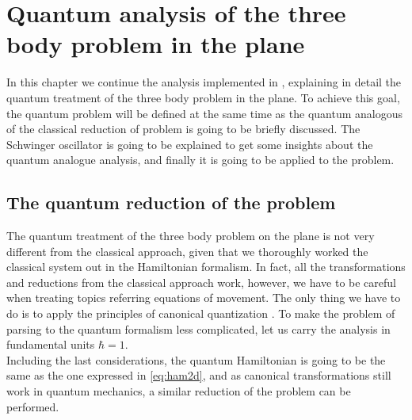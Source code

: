 \chapter{Quantum analysis of the three body problem in the plane}
In this chapter we continue the analysis implemented in \cite{alonso}, explaining in detail the quantum treatment of the three body problem in the plane. To achieve this goal, the quantum problem will be defined at the same time as the quantum analogous of the classical reduction of problem is going to be briefly discussed. The Schwinger oscillator is going to be explained to get some insights about the quantum analogue analysis, and finally it is going to be applied to the problem.\\

\section{The quantum reduction of the problem}
The quantum treatment of the three body problem on the plane is not very different from the classical approach, given that we thoroughly worked the classical system out in the Hamiltonian formalism. In fact, all the transformations and reductions from the classical approach work, however, we have to be careful when treating topics referring equations of movement.  The only thing we have to do is to apply the principles of canonical quantization \cite{Canonical quantization}. To make the problem of parsing to the quantum formalism less complicated, let us carry the analysis in fundamental units $\hbar =1$. \\

Including the last considerations, the quantum Hamiltonian is going to be the same as the one expressed in \eqref{eq:ham2d}, and as canonical transformations still work in quantum mechanics, a similar reduction of the problem can be performed.\\



